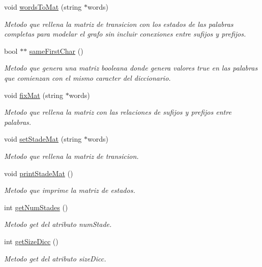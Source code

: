 \begin{DoxyCompactItemize}
void \hyperlink{class_graph_aho_corasick_abcc86ffb6186ebace0764505b51c98e3}{words\+To\+Mat} (string $\ast$words)
\begin{DoxyCompactList}\small\item\em Metodo que rellena la matriz de transicion con los estados de las palabras completas para modelar el grafo sin incluir conexiones entre sufijos y prefijos. \end{DoxyCompactList}\item 
bool $\ast$$\ast$ \hyperlink{class_graph_aho_corasick_a315229703f61d34621c52c8b327e5985}{same\+First\+Char} ()
\begin{DoxyCompactList}\small\item\em Metodo que genera una matriz booleana donde genera valores true en las palabras que comienzan con el mismo caracter del diccionario. \end{DoxyCompactList}\item 
void \hyperlink{class_graph_aho_corasick_a7f1b50c6c0cf27630f8d6b50feef46e9}{fix\+Mat} (string $\ast$words)
\begin{DoxyCompactList}\small\item\em Metodo que rellena la matriz con las relaciones de sufijos y prefijos entre palabras. \end{DoxyCompactList}\item 
void \hyperlink{class_graph_aho_corasick_a8a696d54d5810060f61be49ee7dabc58}{set\+Stade\+Mat} (string $\ast$words)
\begin{DoxyCompactList}\small\item\em Metodo que rellena la matriz de transicion. \end{DoxyCompactList}\item 
void \hyperlink{class_graph_aho_corasick_abe30b2726160786d41f04dbdb5fc0aa2}{print\+Stade\+Mat} ()
\begin{DoxyCompactList}\small\item\em Metodo que imprime la matriz de estados. \end{DoxyCompactList}\item 
int \hyperlink{class_graph_aho_corasick_a01a05df2b0d49b420a127fbb2ceb288c}{get\+Num\+Stades} ()
\begin{DoxyCompactList}\small\item\em Metodo get del atributo num\+Stade. \end{DoxyCompactList}\item 
int \hyperlink{class_graph_aho_corasick_ae1e4f47012e1937511d7be9446890e5a}{get\+Size\+Dicc} ()
\begin{DoxyCompactList}\small\item\em Metodo get del atributo size\+Dicc. \end{DoxyCompactList}\item 
$$
\end{DoxyCompactItemize}
